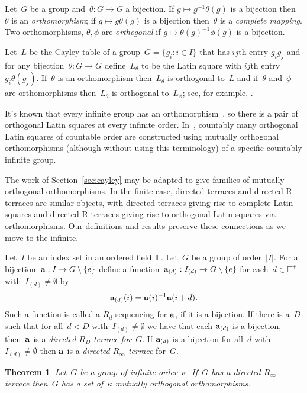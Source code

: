 \documentclass[12pt,a4paper]{article}
\newtheorem{thm}{Theorem}[section]
\newcommand{\F}{\mathbb{F}}
\renewcommand{\a}{\textup{\textbf{a}}}
\begin{document}
Let~$G$ be a group and~$\theta: G \rightarrow G$ a bijection.  If $g \mapsto g^{-1}\theta(g)$ is a bijection then~$\theta$ is an {\em orthomorphism}; if  $g \mapsto g\theta(g)$ is a bijection then~$\theta$ is a {\em complete mapping}.  Two orthomorphisms, $\theta, \phi$ are {\em orthogonal} if $g \mapsto \theta(g)^{-1} \phi(g)$ is a bijection.

Let~$L$ be the Cayley table of a group~$G = \{ g_i : i \in I \}$ that has $ij$th entry $g_i g_j$ and for any bijection~$\theta: G \rightarrow G$ define~$L_\theta$ to be the Latin square with $ij$th entry $g_i \theta(g_j)$.  If~$\theta$ is an orthomorphism then~$L_\theta$ is orthogonal to~$L$ and if~$\theta$ and~$\phi$ are orthomorphisms then~$L_\theta$ is orthogonal to~$L_\phi$; see, for example, \cite{Evans07}.

It's known that every infinite group has an orthomorphism~\cite{Bateman50}, so there is a pair of orthogonal Latin squares at every infinite order.  In~\cite{BM91}, countably many orthogonal Latin squares of countable order are constructed using mutually orthogonal orthomorphisms (although without using this terminology) of a specific countably infinite group.


The work of Section~\ref{sec:cayley} may be adapted to give families of mutually orthogonal orthomorphisms.  In the finite case, directed terraces and directed R-terraces are similar objects, with directed terraces giving rise to complete Latin squares and directed R-terraces giving rise to orthogonal Latin squares via orthomorphisms.  Our definitions and results preserve these connections as we move to the infinite.

Let~$I$ be an index set in an ordered field~$\F$.  Let~$G$ be a group of order~$|I|$.  For a bijection~${\bf a}: I \rightarrow G \setminus \{ e \}$ define a function~${\bf a}_{(d)}: I_{(d)} \rightarrow G \setminus \{ e \}$ for each~$d \in \F^+$ with~$I_{(d)} \neq \emptyset$ by
$${\bf a}_{(d)}(i) = {\bf a}(i)^{-1}{\bf a}(i+d).$$ Such a function is called a $R_d$-sequencing for $\a$, if it is a bijection.
If there is a~$D$ such that for all~$d < D$ with~$I_{(d)} \neq \emptyset$ we have that each ${\bf a}_{(d)}$ is a bijection, then~${\bf a}$ is a {\em directed $R_D$-terrace for~$G$}.  If ${\bf a}_{(d)}$ is a bijection for all~$d$  with~$I_{(d)} \neq \emptyset$ then ${\bf a}$ is  a {\em directed $R_{\infty}$-terrace} for~$G$.


\begin{thm}
Let~$G$ be a group of infinite order~$\kappa$.  If~$G$ has a directed $R_{\infty}$-terrace then~$G$ has a set of~$ \kappa$ mutually orthogonal orthomorphisms. 
\end{thm}
\end{document}
